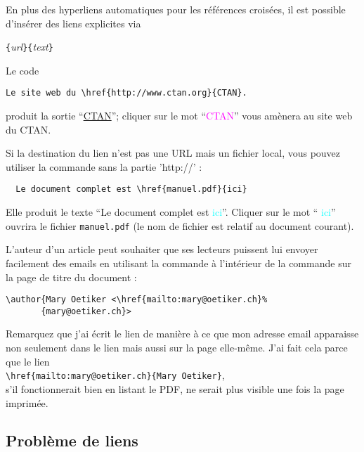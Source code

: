\vspace{\baselineskip}

En plus des hyperliens automatiques pour les références croisées, il
est possible d'insérer des liens explicites via
\begin{lscommand}
\verb|{|\emph{url}\verb|}{|\emph{text}\verb|}|
\end{lscommand}

Le code
\begin{code}
\begin{verbatim}
Le site web du \href{http://www.ctan.org}{CTAN}.
\end{verbatim}
\end{code}
produit la sortie \enquote{\href{http://www.ctan.org}{CTAN}}; cliquer
sur le mot \enquote{\textcolor{magenta}{CTAN}} vous amènera au site
web du CTAN.

Si la destination du lien n'est pas une URL mais un fichier local,
vous pouvez utiliser la commande  sans la partie 'http://' :
\begin{verbatim}
  Le document complet est \href{manuel.pdf}{ici}
\end{verbatim}
Elle produit le texte \enquote{Le document complet est
\textcolor{cyan}{ici}}. Cliquer sur le mot \enquote{
\textcolor{cyan}{ici}} ouvrira le fichier \texttt{manuel.pdf} (le
nom de fichier est relatif au document courant).

L'auteur d'un article peut souhaiter que ses lecteurs puissent lui
envoyer facilement des emails en utilisant la commande  à
l'intérieur de la commande  sur la page de titre du
document :
\begin{code}
\begin{verbatim}
\author{Mary Oetiker <\href{mailto:mary@oetiker.ch}%
       {mary@oetiker.ch}>
\end{verbatim}
\end{code}
Remarquez que j'ai écrit le lien de manière à ce que mon adresse email
apparaisse non seulement dans le lien mais aussi sur la page
elle-même. J'ai fait cela parce que le lien\\
\verb+\href{mailto:mary@oetiker.ch}{Mary Oetiker}+,\\
s'il fonctionnerait bien en listant le PDF, ne serait plus visible une fois
la page imprimée.

\subsection{Problème de liens}

